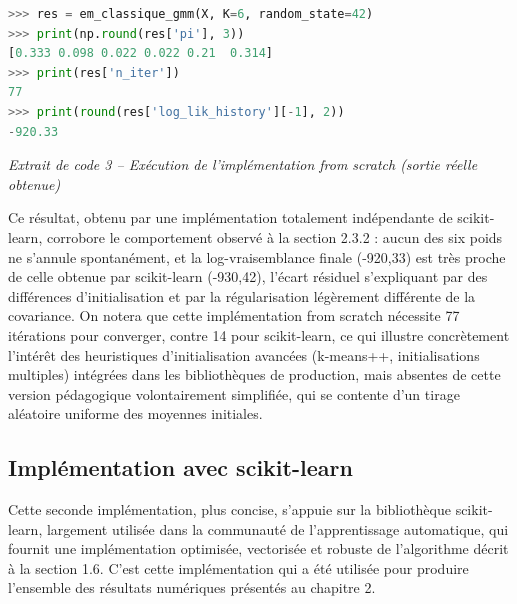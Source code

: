 \begin{lstlisting}[language=Python]
>>> res = em_classique_gmm(X, K=6, random_state=42)
>>> print(np.round(res['pi'], 3))
[0.333 0.098 0.022 0.022 0.21  0.314]
>>> print(res['n_iter'])
77
>>> print(round(res['log_lik_history'][-1], 2))
-920.33
\end{lstlisting}
\begin{center}\small\emph{Extrait de code 3 -- Exécution de l'implémentation from scratch (sortie réelle obtenue)}\end{center}
Ce résultat, obtenu par une implémentation totalement indépendante de scikit-learn, corrobore le comportement observé à la section 2.3.2 : aucun des six poids ne s'annule spontanément, et la log-vraisemblance finale (-920,33) est très proche de celle obtenue par scikit-learn (-930,42), l'écart résiduel s'expliquant par des différences d'initialisation et par la régularisation légèrement différente de la covariance. On notera que cette implémentation from scratch nécessite 77 itérations pour converger, contre 14 pour scikit-learn, ce qui illustre concrètement l'intérêt des heuristiques d'initialisation avancées (k-means++, initialisations multiples) intégrées dans les bibliothèques de production, mais absentes de cette version pédagogique volontairement simplifiée, qui se contente d'un tirage aléatoire uniforme des moyennes initiales.

\subsection{Implémentation avec scikit-learn}
Cette seconde implémentation, plus concise, s'appuie sur la bibliothèque scikit-learn, largement utilisée dans la communauté de l'apprentissage automatique, qui fournit une implémentation optimisée, vectorisée et robuste de l'algorithme décrit à la section 1.6. C'est cette implémentation qui a été utilisée pour produire l'ensemble des résultats numériques présentés au chapitre 2.

